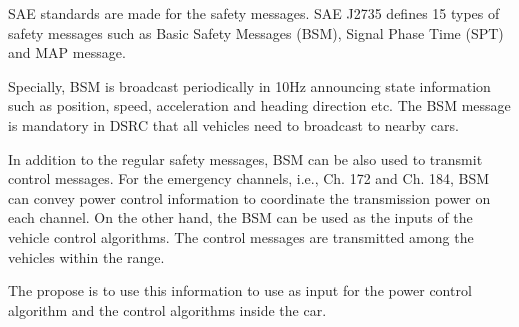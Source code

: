 SAE standards are made for the safety messages. SAE J2735 defines 15 types of safety messages such as Basic Safety Messages (BSM), Signal Phase Time (SPT) and MAP message. 

Specially, BSM is broadcast periodically in 10Hz announcing state information such as position, speed, acceleration and heading direction etc. The BSM message is mandatory in DSRC that all vehicles need to broadcast to nearby cars. 

In addition to the regular safety messages, BSM can be also used to transmit control messages. For the emergency channels, i.e., Ch. 172 and Ch. 184, BSM can convey power control information to coordinate the transmission power on each channel. On the other hand, the BSM can be used as the inputs of the vehicle control algorithms. The control messages are transmitted among the vehicles within the range. 

The propose is to use this information to use as input for the power control algorithm and the  control algorithms inside the car.
